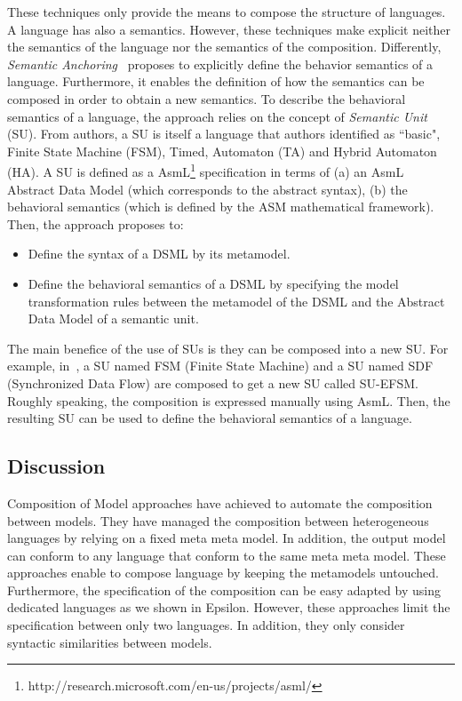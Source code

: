 These techniques only provide the means to compose the structure of languages. A language has also a semantics. However, these techniques make explicit neither the semantics of the language nor the semantics of the composition. Differently, \emph{Semantic Anchoring}~\cite{semanticsanchoring} proposes to explicitly define the behavior semantics of a language. Furthermore, it enables the definition of how the semantics can be composed in order to obtain a new semantics. To describe the behavioral semantics of a language, the approach relies on the concept of \emph{Semantic Unit} (SU). From authors, a SU is itself a language that authors identified as ``basic", \eg Finite State Machine (FSM), Timed, Automaton (TA) and Hybrid Automaton (HA). A SU is defined as a AsmL\footnote{http://research.microsoft.com/en-us/projects/asml/} specification in terms of (a) an AsmL Abstract Data Model (which corresponds to the abstract syntax), (b) the behavioral semantics (which is defined by the ASM mathematical framework). Then, the approach proposes to:
\begin{itemize}
	\item Define the syntax of a DSML by its metamodel. 
	\item Define the behavioral semantics of a DSML by specifying the model transformation rules between the metamodel of the DSML and the Abstract Data Model of a semantic unit. 
\end{itemize}    
The main benefice of the use of SUs is they can be composed into a new SU. For example, in~\cite{composemanticanch}, a SU named FSM (Finite State Machine) and a SU named SDF (Synchronized Data Flow) are composed to get a new SU called SU-EFSM. Roughly speaking, the composition is expressed manually using AsmL. Then, the resulting SU can be used to define the behavioral semantics of a language.

\subsection{Discussion}
Composition of Model approaches have achieved to automate the composition between models. They have managed the composition between heterogeneous languages by relying on a fixed meta meta model. In addition, the output model can conform to any language that conform to the same meta meta model. These approaches enable to compose language by keeping the metamodels untouched. Furthermore, the specification of the composition can be easy adapted by using dedicated languages as we shown in Epsilon. However, these approaches limit the specification between only two languages. In addition, they only consider syntactic similarities between models. 

